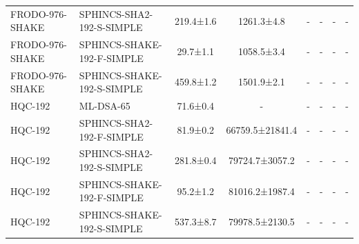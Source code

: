 \documentclass[10pt]{article}
\begin{document}
\begin{tabular}{@{}l l c c c c c c@{}}
FRODO-976-SHAKE & SPHINCS-SHA2-192-S-SIMPLE & 219.4±1.6 & 1261.3±4.8 & - & - & - & - \\
FRODO-976-SHAKE & SPHINCS-SHAKE-192-F-SIMPLE & 29.7±1.1 & 1058.5±3.4 & - & - & - & - \\
FRODO-976-SHAKE & SPHINCS-SHAKE-192-S-SIMPLE & 459.8±1.2 & 1501.9±2.1 & - & - & - & - \\
HQC-192 & ML-DSA-65 & 71.6±0.4 & - & - & - & - & - \\
HQC-192 & SPHINCS-SHA2-192-F-SIMPLE & 81.9±0.2 & 66759.5±21841.4 & - & - & - & - \\
HQC-192 & SPHINCS-SHA2-192-S-SIMPLE & 281.8±0.4 & 79724.7±3057.2 & - & - & - & - \\
HQC-192 & SPHINCS-SHAKE-192-F-SIMPLE & 95.2±1.2 & 81016.2±1987.4 & - & - & - & - \\
HQC-192 & SPHINCS-SHAKE-192-S-SIMPLE & 537.3±8.7 & 79978.5±2130.5 & - & - & - & - \\
\bottomrule
\end{tabular}
\end{document}
